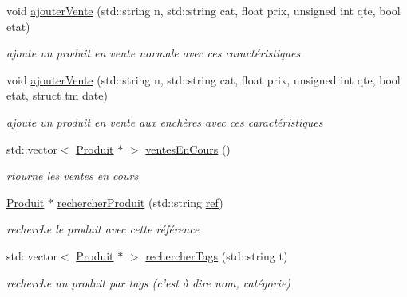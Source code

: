 \begin{DoxyCompactItemize}
void \hyperlink{class_gestion_bdd_ac8c3809d6de97f0e81cd5045a4a72c7e}{ajouter\-Vente} (std\-::string n, std\-::string cat, float prix, unsigned int qte, bool etat)
\begin{DoxyCompactList}\small\item\em ajoute un produit en vente normale avec ces caractéristiques \end{DoxyCompactList}\item 
void \hyperlink{class_gestion_bdd_af4e95573213751d5487464ff3e24cc98}{ajouter\-Vente} (std\-::string n, std\-::string cat, float prix, unsigned int qte, bool etat, struct tm date)
\begin{DoxyCompactList}\small\item\em ajoute un produit en vente aux enchères avec ces caractéristiques \end{DoxyCompactList}\item 
std\-::vector$<$ \hyperlink{class_produit}{Produit} $\ast$ $>$ \hyperlink{class_gestion_bdd_aa52e1f2d076c4e3f65162e9f28ed20fa}{ventes\-En\-Cours} ()
\begin{DoxyCompactList}\small\item\em rtourne les ventes en cours \end{DoxyCompactList}\item 
\hyperlink{class_produit}{Produit} $\ast$ \hyperlink{class_gestion_bdd_abf0ffd54c39d6dfe431fc8d556eb5c8d}{rechercher\-Produit} (std\-::string \hyperlink{class_gestion_bdd_ae9e26a2043f3e10fb773107809bfc007}{ref})
\begin{DoxyCompactList}\small\item\em recherche le produit avec cette référence \end{DoxyCompactList}\item 
std\-::vector$<$ \hyperlink{class_produit}{Produit} $\ast$ $>$ \hyperlink{class_gestion_bdd_aadc12bc0c3aee41bc56918e44b5d1085}{rechercher\-Tags} (std\-::string t)
\begin{DoxyCompactList}\small\item\em recherche un produit par tags (c'est à dire nom, catégorie) \end{DoxyCompactList}\end{DoxyCompactItemize}
